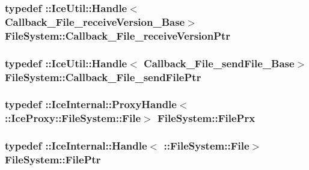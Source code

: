 \subsubsection[{Callback\+\_\+\+File\+\_\+receive\+Version\+Ptr}]{\setlength{\rightskip}{0pt plus 5cm}typedef \+::Ice\+Util\+::\+Handle$<$ {\bf Callback\+\_\+\+File\+\_\+receive\+Version\+\_\+\+Base}$>$ {\bf File\+System\+::\+Callback\+\_\+\+File\+\_\+receive\+Version\+Ptr}}\label{namespace_file_system_a9f139d463637347415d1d3dadefe9bad}
\hypertarget{namespace_file_system_aa10040959d9776f7f500f38a2567b56e}{}
\subsubsection[{Callback\+\_\+\+File\+\_\+send\+File\+Ptr}]{\setlength{\rightskip}{0pt plus 5cm}typedef \+::Ice\+Util\+::\+Handle$<$ {\bf Callback\+\_\+\+File\+\_\+send\+File\+\_\+\+Base}$>$ {\bf File\+System\+::\+Callback\+\_\+\+File\+\_\+send\+File\+Ptr}}\label{namespace_file_system_aa10040959d9776f7f500f38a2567b56e}
\hypertarget{namespace_file_system_a2cca5b42d5ab231d91dd889d4d74218c}{}
\subsubsection[{File\+Prx}]{\setlength{\rightskip}{0pt plus 5cm}typedef \+::Ice\+Internal\+::\+Proxy\+Handle$<$ \+::{\bf Ice\+Proxy\+::\+File\+System\+::\+File}$>$ {\bf File\+System\+::\+File\+Prx}}\label{namespace_file_system_a2cca5b42d5ab231d91dd889d4d74218c}
\hypertarget{namespace_file_system_a322304ec4ae6dc6308f79d49662764bb}{}
\subsubsection[{File\+Ptr}]{\setlength{\rightskip}{0pt plus 5cm}typedef \+::Ice\+Internal\+::\+Handle$<$ \+::{\bf File\+System\+::\+File}$>$ {\bf File\+System\+::\+File\+Ptr}}\label{namespace_file_system_a322304ec4ae6dc6308f79d49662764bb}
\hypertarget{namespace_file_system_ac32dc1eb34c060160b52edc7c4e37d6e}{}
